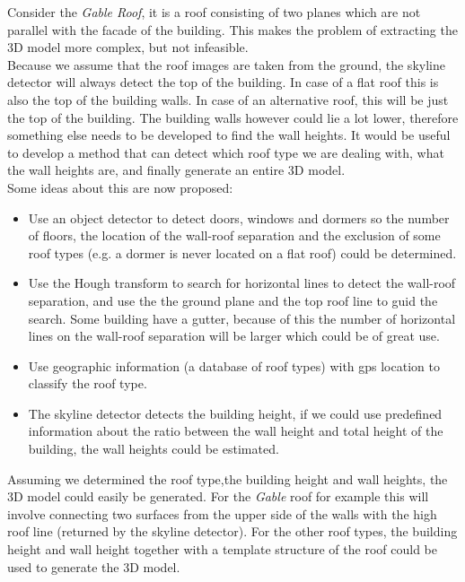Consider the \emph{Gable Roof}, it is a roof consisting of two planes
which are not parallel with the facade of the building. This makes the problem
of extracting the 3D model more complex, but not infeasible. \\
Because we assume that the roof images are taken from the ground, the skyline
detector will always detect the top of the building. In case of a flat roof
this is also the top of the building walls. In case of an
alternative roof, this will be just the top of the building. The building walls however
could lie a lot lower, therefore something else needs to be developed to find the wall
heights. It would be useful to develop a method that can detect which roof type we
are dealing with, what the wall heights are, and finally generate an entire 3D
model.\\
Some ideas about this are now proposed:\\
\begin{itemize}
	\item Use an object detector to detect doors, windows and dormers so the 
	number of floors, the location of the wall-roof separation and the exclusion of
	some roof types (e.g. a dormer is never located on a flat roof) could be determined.\\
	\item Use the Hough transform to search for horizontal lines to detect the
	wall-roof separation, and use the the ground plane and the top roof line to
	guid the search.  Some building have a gutter, because of this the number
	of horizontal lines on the wall-roof separation will be larger which could
	be of great use.\\
	\item Use geographic information (a database of roof types) with gps location
	to classify the roof type. \\
	\item The skyline detector detects the building height, if we
	could use predefined information about the ratio between the wall height and
	total height of the building, the wall heights could be estimated.\\
\end{itemize}
Assuming we determined the roof type,the building height and wall heights, the 3D model could 
easily be generated. For the \emph{Gable} roof for example this will involve
connecting two surfaces from the upper side of the walls with the high roof line (returned by the
skyline detector). For the other roof types, the building height and wall
height together with a template structure of the roof could be used to generate the 3D
model.


